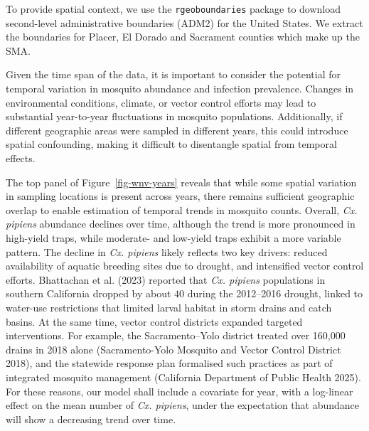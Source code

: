 \documentclass[
  letterpaper,
]{krantz}
\newenvironment{Shaded}{\begin{snugshade}}{\end{snugshade}}
\newcommand{\AttributeTok}[1]{\textcolor[rgb]{0.13,0.29,0.53}{#1}}
\newcommand{\CommentTok}[1]{\textcolor[rgb]{0.56,0.35,0.01}{\textit{#1}}}
\newcommand{\FunctionTok}[1]{\textcolor[rgb]{0.13,0.29,0.53}{\textbf{#1}}}
\newcommand{\NormalTok}[1]{#1}
\newcommand{\OtherTok}[1]{\textcolor[rgb]{0.56,0.35,0.01}{#1}}
\newcommand{\SpecialCharTok}[1]{\textcolor[rgb]{0.81,0.36,0.00}{\textbf{#1}}}
\newcommand{\StringTok}[1]{\textcolor[rgb]{0.31,0.60,0.02}{#1}}
\begin{document}
To provide spatial context, we use the \texttt{rgeoboundaries} package
to download second-level administrative boundaries (ADM2) for the United
States. We extract the boundaries for Placer, El Dorado and Sacrament
counties which make up the SMA.

\begin{Shaded}
\end{Shaded}

Given the time span of the data, it is important to consider the
potential for temporal variation in mosquito abundance and infection
prevalence. Changes in environmental conditions, climate, or vector
control efforts may lead to substantial year-to-year fluctuations in
mosquito populations. Additionally, if different geographic areas were
sampled in different years, this could introduce spatial confounding,
making it difficult to disentangle spatial from temporal effects.

The top panel of Figure~\ref{fig-wnv-years} reveals that while some
spatial variation in sampling locations is present across years, there
remains sufficient geographic overlap to enable estimation of temporal
trends in mosquito counts. Overall, \emph{Cx. pipiens} abundance
declines over time, although the trend is more pronounced in high-yield
traps, while moderate- and low-yield traps exhibit a more variable
pattern. The decline in \emph{Cx. pipiens} likely reflects two key
drivers: reduced availability of aquatic breeding sites due to drought,
and intensified vector control efforts. Bhattachan et al. (2023)
reported that \emph{Cx. pipiens} populations in southern California
dropped by about \(40%
\) during the 2012--2016 drought, linked to water-use restrictions that
limited larval habitat in storm drains and catch basins. At the same
time, vector control districts expanded targeted interventions. For
example, the Sacramento--Yolo district treated over 160,000 drains in
2018 alone (Sacramento-Yolo Mosquito and Vector Control District 2018),
and the statewide response plan formalised such practices as part of
integrated mosquito management (California Department of Public Health
2025). For these reasons, our model shall include a covariate for year,
with a log-linear effect on the mean number of \emph{Cx. pipiens}, under
the expectation that abundance will show a decreasing trend over time.
\end{document}
